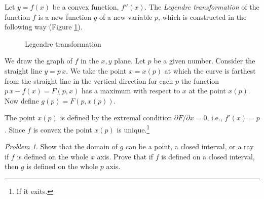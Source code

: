 \documentclass[leqno]{report}
\numberwithin{equation}{section}
\theoremstyle{plain}
\theoremstyle{definition}
\theoremstyle{remark}
\theoremstyle{smallcap}
\newtheorem*{prob*}{Problem}
\numberwithin{prob}{section}
\begin{document}
Let $y = f(x)$ be a convex function, $f''(x)$.
%
The \emph{Legendre transformation}
of the function $f$ is a new function $g$ of a new variable $p$,
which is constructed in the following way
(Figure \ref{fig:Legendre_transformation}).


\setcounter{figure}{42}
\begin{figure}[h]
  \centering
  \caption{
    \label{fig:Legendre_transformation}
    Legendre transformation
  }
\end{figure}

We draw the graph of $f$ in the $x,y$ plane.
%
Let $p$ be a given number.
%
Consider the straight line $y = p \, x$.
%
We take the point $x = x(p)$
at which the curve is farthest from the straight line
in the vertical direction for each $p$ the function
$p \, x - f(x) = F(p, x)$ has a maximum with respect to $x$
at the point $x(p)$.
%
Now define $g(p) = F(p, x(p))$.

The point $x(p)$ is defined by the extremal condition
$\partial F/\partial x = 0$, i.e.,
$f'(x) = p$.
%
Since $f$ is convex the point $x(p)$ is unique.\footnote{
If it exits.}

\begin{prob*}
  Show that the domain of $g$ can be a point,
  a closed interval, or a ray if $f$ is defined
  on the whole $x$ axis.
  Prove that if $f$ is defined on a closed interval,
  then $g$ is defined on the whole $p$ axis.

\end{prob*}
\end{document}
